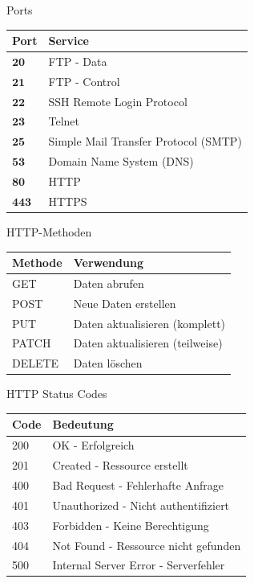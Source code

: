\begin{corollary}{Ports}
    \begin{center}
    \begin{tabular}{|l|l|}
    \hline
    Port & Service \\
    \hline
    $\mathbf{20}$ & FTP - Data \\
    \hline
    $\mathbf{21}$ & FTP - Control \\
    \hline
    $\mathbf{22}$ & SSH Remote Login Protocol \\
    \hline
    $\mathbf{23}$ & Telnet \\
    \hline
    $\mathbf{25}$ & Simple Mail Transfer Protocol (SMTP) \\
    \hline
    $\mathbf{53}$ & Domain Name System (DNS) \\
    \hline
    $\mathbf{80}$ & HTTP \\
    \hline
    $\mathbf{443}$ & HTTPS \\
    \hline
    \end{tabular}
    \end{center}
\end{corollary}

\begin{theorem}{HTTP-Methoden}
    \begin{center}
    \begin{tabular}{|l|l|}
    \hline
    Methode & Verwendung \\
    \hline
    GET & Daten abrufen \\
    \hline
    POST & Neue Daten erstellen \\
    \hline
    PUT & Daten aktualisieren (komplett) \\
    \hline
    PATCH & Daten aktualisieren (teilweise) \\
    \hline
    DELETE & Daten löschen \\
    \hline
    \end{tabular}
    \end{center}
\end{theorem}

\begin{corollary}{HTTP Status Codes}
    \begin{center}
    \begin{tabular}{|l|l|}
    \hline
    Code & Bedeutung \\
    \hline
    200 & OK - Erfolgreich \\
    \hline
    201 & Created - Ressource erstellt \\
    \hline
    400 & Bad Request - Fehlerhafte Anfrage \\
    \hline
    401 & Unauthorized - Nicht authentifiziert \\
    \hline
    403 & Forbidden - Keine Berechtigung \\
    \hline
    404 & Not Found - Ressource nicht gefunden \\
    \hline
    500 & Internal Server Error - Serverfehler \\
    \hline
    \end{tabular}
    \end{center}
\end{corollary}
\columnbreak

